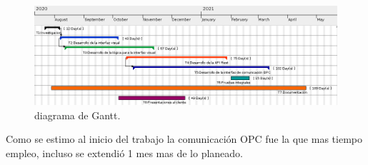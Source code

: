 \begin{figure}[htpb]
	\centering
	\includegraphics[width=14cm]{./Figures/gantt_1.png}
	\caption{diagrama de Gantt\protect\footnotemark.}
	\label{figure:gantt}
\end{figure}

Como se estimo al inicio del trabajo la comunicación OPC fue la que mas tiempo empleo, incluso se extendió 1 mes mas de lo planeado. 